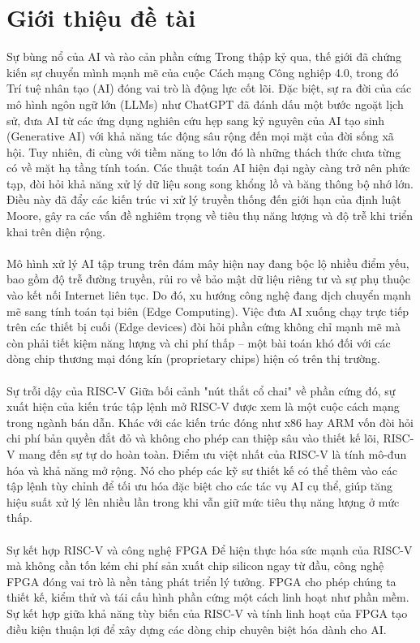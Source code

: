 \chapter{Giới thiệu đề tài}
Sự bùng nổ của AI và rào cản phần cứng Trong thập kỷ qua, thế giới đã chứng kiến sự chuyển mình mạnh mẽ của cuộc Cách mạng Công nghiệp 4.0, trong đó Trí tuệ nhân tạo (AI) đóng vai trò là động lực cốt lõi. Đặc biệt, sự ra đời của các mô hình ngôn ngữ lớn (LLMs) như ChatGPT đã đánh dấu một bước ngoặt lịch sử, đưa AI từ các ứng dụng nghiên cứu hẹp sang kỷ nguyên của AI tạo sinh (Generative AI) với khả năng tác động sâu rộng đến mọi mặt của đời sống xã hội. Tuy nhiên, đi cùng với tiềm năng to lớn đó là những thách thức chưa từng có về mặt hạ tầng tính toán. Các thuật toán AI hiện đại ngày càng trở nên phức tạp, đòi hỏi khả năng xử lý dữ liệu song song khổng lồ và băng thông bộ nhớ lớn. Điều này đã đẩy các kiến trúc vi xử lý truyền thống đến giới hạn của định luật Moore, gây ra các vấn đề nghiêm trọng về tiêu thụ năng lượng và độ trễ khi triển khai trên diện rộng.\\
\\
Mô hình xử lý AI tập trung trên đám mây hiện nay đang bộc lộ nhiều điểm yếu, bao gồm độ trễ đường truyền, rủi ro về bảo mật dữ liệu riêng tư và sự phụ thuộc vào kết nối Internet liên tục. Do đó, xu hướng công nghệ đang dịch chuyển mạnh mẽ sang tính toán tại biên (Edge Computing). Việc đưa AI xuống chạy trực tiếp trên các thiết bị cuối (Edge devices) đòi hỏi phần cứng không chỉ mạnh mẽ mà còn phải tiết kiệm năng lượng và chi phí thấp – một bài toán khó đối với các dòng chip thương mại đóng kín (proprietary chips) hiện có trên thị trường.\\
\\
Sự trỗi dậy của RISC-V Giữa bối cảnh "nút thắt cổ chai" về phần cứng đó, sự xuất hiện của kiến trúc tập lệnh mở RISC-V được xem là một cuộc cách mạng trong ngành bán dẫn. Khác với các kiến trúc đóng như x86 hay ARM vốn đòi hỏi chi phí bản quyền đắt đỏ và không cho phép can thiệp sâu vào thiết kế lõi, RISC-V mang đến sự tự do hoàn toàn. Điểm ưu việt nhất của RISC-V là tính mô-đun hóa  và khả năng mở rộng. Nó cho phép các kỹ sư thiết kế có thể thêm vào các tập lệnh tùy chỉnh để tối ưu hóa đặc biệt cho các tác vụ AI cụ thể, giúp tăng hiệu suất xử lý lên nhiều lần trong khi vẫn giữ mức tiêu thụ năng lượng ở mức thấp.\\
\\
Sự kết hợp RISC-V và công nghệ FPGA Để hiện thực hóa sức mạnh của RISC-V mà không cần tốn kém chi phí sản xuất chip silicon ngay từ đầu, công nghệ FPGA đóng vai trò là nền tảng phát triển lý tưởng. FPGA cho phép chúng ta thiết kế, kiểm thử và tái cấu hình phần cứng một cách linh hoạt như phần mềm. Sự kết hợp giữa khả năng tùy biến của RISC-V và tính linh hoạt của FPGA tạo điều kiện thuận lợi để xây dựng các dòng chip chuyên biệt hóa dành cho AI.

